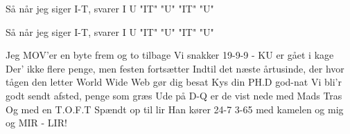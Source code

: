 \documentclass[danish]{article}
\begin{document}
\begin{song}

Så når jeg siger I-T, svarer I U
"IT"    "U"
"IT"    "U"
                                       
Så når jeg siger I-T, svarer I U
"IT" "U"
"IT" "U"

Jeg MOV'er en byte frem og to tilbage
Vi snakker 19-9-9 - KU er gået i kage
Der' ikke flere penge, men festen fortsætter
Indtil det næste årtusinde, der hvor tågen den letter
World Wide Web gør dig besat
Kys din PH.D god-nat
Vi bli'r godt sendt afsted, penge som græs
Ude på D-Q er de vist nede med Mads Tras
Og med en T.O.F.T Spændt op til lir
Han kører 24-7 3-65 med kamelen og mig og MIR - LIR!


\end{song}
\end{document}
